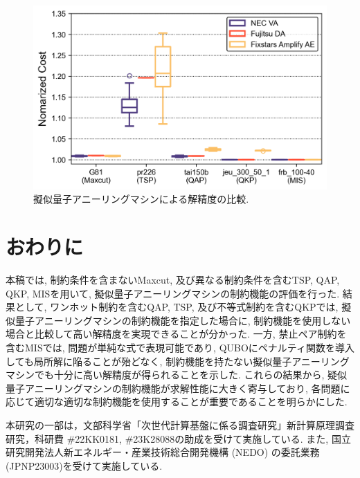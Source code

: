 \documentclass[submit,techrep,noauthor]{ipsj}
\begin{document}
\begin{figure}[tb]
\centering
\includegraphics[bb=0 0 700 230, width=15cm]{Cost_All.png}
\caption{擬似量子アニーリングマシンによる解精度の比較.}
\label{Cost_All}
\end{figure}

\section{おわりに}
本稿では, 制約条件を含まないMaxcut, 及び異なる制約条件を含むTSP, QAP, QKP, MISを用いて, 擬似量子アニーリングマシンの制約機能の評価を行った. 結果として, ワンホット制約を含むQAP, TSP, 及び不等式制約を含むQKPでは, 擬似量子アニーリングマシンの制約機能を指定した場合に, 制約機能を使用しない場合と比較して高い解精度を実現できることが分かった. 一方, 禁止ペア制約を含むMISでは, 問題が単純な式で表現可能であり, QUBOにペナルティ関数を導入しても局所解に陥ることが殆どなく, 制約機能を持たない擬似量子アニーリングマシンでも十分に高い解精度が得られることを示した. これらの結果から, 疑似量子アニーリングマシンの制約機能が求解性能に大きく寄与しており, 各問題に応じて適切な適切な制約機能を使用することが重要であることを明らかにした.

\begin{acknowledgment}
本研究の一部は，文部科学省「次世代計算基盤に係る調査研究」新計算原理調査研究，科研費 \#22KK0181, \#23K28088の助成を受けて実施している. また, 国立研究開発法人新エネルギー・産業技術総合開発機構 (NEDO) の委託業務 (JPNP23003)を受けて実施している.
\end{acknowledgment}
\end{document}
